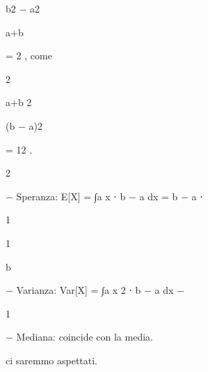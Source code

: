 \documentclass[a4paper,portrait,12pt]{article}
\begin{document}
\begin{flushleft}
b2 $-$ a2
\end{flushleft}


\begin{flushleft}
a+b
\end{flushleft}


\begin{flushleft}
= 2 , come
\end{flushleft}


2


\begin{flushleft}
a+b 2
\end{flushleft}


\begin{flushleft}
(b $-$ a)2
\end{flushleft}


= 12 .


2





\begin{flushleft}
$-$ Speranza: E[X] = ∫a x ⋅ b $-$ a dx = b $-$ a ⋅
\end{flushleft}


1





1





\begin{flushleft}
b
\end{flushleft}





\begin{flushleft}
$-$ Varianza: Var[X] = ∫a x 2 ⋅ b $-$ a dx $-$
\end{flushleft}


1





\begin{flushleft}
$-$ Mediana: coincide con la media.
\end{flushleft}





\begin{flushleft}
ci saremmo aspettati.
\end{flushleft}
\end{document}
